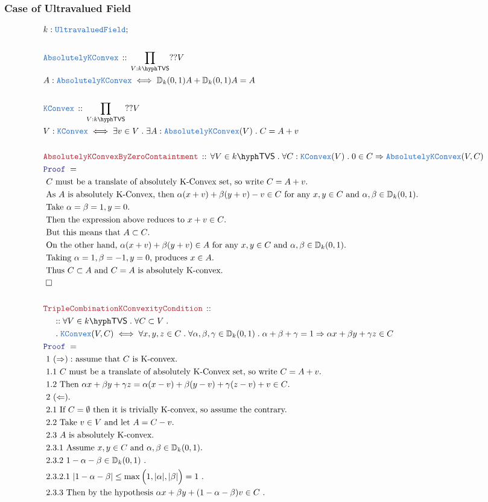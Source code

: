 \documentclass[12pt]{scrartcl}
\newcommand{\TYPE}[1]{\textcolor{NavyBlue}{\mathtt{#1}}}
\newcommand{\LOGIC}[1]{\textcolor{Blue}{\mathtt{#1}}}
\newcommand{\THM}[1]{\textcolor{Maroon}{\mathtt{#1}}}
\renewcommand{\.}{\; . \;}
\newcommand{\Theorem}[2]{& \THM{#1} \, :: \, #2 \\ & \Proof = \\ }
\newcommand{\DeclareType}[2]{& \TYPE{#1} \, :: \, #2 \\}
\newcommand{\DefineType}[3]{& #1 : \TYPE{#2} \iff #3 \\}
\newcommand{\NewLine}{\\ & \kern 1pc}
\newcommand{\Page}[1]{ \begin{align*} #1 \end{align*}   }
\newcommand{\Explain}[1]{& \text{#1.} \\}
\newcommand{\Imply}{\Rightarrow}
\newcommand{\QED}{\; \square}
\newcommand{\EndProof}{& \QED \\}
\newcommand{\Proof}{\LOGIC{Proof} \; }
\newcommand{\Disc}{\mathbb{D}}
\newcommand{\AKC}{\TYPE{AbsolutelyKConvex}}
\newcommand{\KC}{\TYPE{KConvex}}
\newcommand{\TVS}[1]{{#1}\hyph\mathsf{TVS}}
\begin{document}
\subsubsection{Case of Ultravalued Field}
\Page{
	& k : \TYPE{UltravaluedField}; \\
	\\
	\DeclareType{\AKC}{\prod_{V : \TVS{k}} ??V}
	\DefineType{A}{\AKC}{
		\Disc_k(0,1)A +\Disc_k(0,1)A = A	
	}
	\\
	\DeclareType{\KC}{\prod_{V : \TVS{k}} ??V}
	\DefineType{V}{\KC}{
		\exists v \in V \. \exists A : \AKC(V) \. C = A + v	
	}
	\\
	\Theorem{AbsolutelyKConvexByZeroContaintment}
	{
		\forall V \in \TVS{k} \.
		\forall C : \KC(V) \.
		0 \in C \Imply \AKC(V,C)
	}
	\Explain{ $C$ must be a translate of absolutely K-Convex set, so write $C = A + v$}
	\Explain{
			As $A$ is absolutely K-Convex, then
			$\alpha(x + v) + \beta(y + v) - v \in C$ for any $x,y \in C$ and $\alpha,\beta \in \Disc_k(0,1)$}
	\Explain{
		Take $\alpha = \beta =1, y=0$}
	\Explain{
		Then the expression above reduces to $x + v \in C$}
	\Explain{
		But this means that $ A \subset C$}
	\Explain{
		On the other hand,  $\alpha(x + v) + \beta(y + v) \in A$
		for any $x,y \in C$ and $\alpha,\beta \in \Disc_k(0,1)$}
	\Explain{
		Taking $\alpha = 1, \beta = -1, y=0$, produces $x \in A$}
	\Explain{
		Thus $C \subset A$ and $C = A$ is absolutely K-convex}
	\EndProof
	\\
	\Theorem{TripleCombinationKConvexityCondition}
	{
		\NewLine ::		
		\forall V \in \TVS{k} \.
		\forall C \subset V \. \NewLine \.
		\KC(V,C)
		\iff
		\forall x,y,z \in C \.
		\forall \alpha, \beta,\gamma \in \Disc_k(0,1) \.
		\alpha + \beta + \gamma = 1
		\Imply
		\alpha x + \beta y + \gamma z \in C				
	}
	\Explain{ 1 $(\Rightarrow):$ assume that $C$ is K-convex}
	\Explain{ 1.1 $C$ must be a translate of absolutely K-Convex set, so write $C = A + v$}
	\Explain{
		1.2 Then
		$
			\alpha x + \beta y + \gamma z  =
			\alpha (x - v) + \beta (y - v) + \gamma (z - v)  + v \in C
		$}
	\Explain{ 2 $(\Leftarrow)$}
	\Explain{ 2.1 If $C = \emptyset$ then it is trivially K-convex, so assume the contrary}
	\Explain{ 2.2 Take $v \in V$ and let $A = C - v$}
	\Explain{ 2.3 $A$ is absolutely K-convex}
	\Explain{ 2.3.1 Assume $x,y \in C$ and $\alpha,\beta \in \Disc_k(0,1)$}
	\Explain{ 2.3.2 $1 - \alpha - \beta \in \Disc_k(0,1)$ }
	\Explain{ 2.3.2.1 $| 1 - \alpha - \beta| \le \max\Big(1,|\alpha|,|\beta|\Big) = 1$ }
	\Explain{ 2.3.3 Then by the hypothesis
		$ \alpha x + \beta y  + (1 - \alpha - \beta) v \in C  $  }
}
\end{document}
